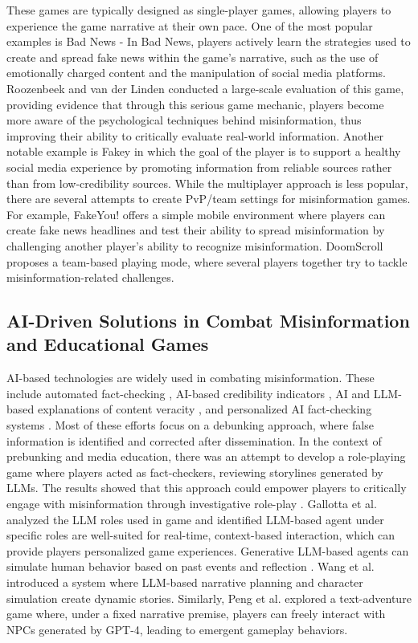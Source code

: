 These games are typically designed as single-player games, allowing players to experience the game narrative at their own pace. One of the most popular examples is Bad News \cite{roozenbeek2019fake}- In Bad News, players actively learn the strategies used to create and spread fake news within the game's narrative, such as the use of emotionally charged content and the manipulation of social media platforms. Roozenbeek and van der Linden \cite{roozenbeek2019fake} conducted a large-scale evaluation of this game, providing evidence that through this serious game mechanic, players become more aware of the psychological techniques behind misinformation, thus improving their ability to critically evaluate real-world information. Another notable example is Fakey \cite{micallef2021fakey} in which the goal of the player is to support a healthy social media experience by promoting information from reliable sources rather than from low-credibility sources. 
While the multiplayer approach is less popular, there are several attempts to create PvP/team settings for misinformation games. For example, FakeYou! \cite{clever2020fakeyou} offers a simple mobile environment where players can create fake news headlines and test their ability to spread misinformation by challenging another player's ability to recognize misinformation. DoomScroll \cite{wells2024sus} proposes a team-based playing mode, where several players together try to tackle misinformation-related challenges.

\subsection{AI-Driven Solutions in Combat Misinformation and Educational Games} 
AI-based technologies are widely used in combating misinformation. These include automated fact-checking \cite{choi2024fact}, AI-based credibility indicators \cite{lu2022effects}, AI and LLM-based explanations of content veracity \cite{horne2019rating,mitgenai2023}, and personalized AI fact-checking systems \cite{jahanbakhsh2023exploring}. Most of these efforts focus on a debunking approach, where false information is identified and corrected after dissemination. 
In the context of prebunking and media education, there was an attempt to develop a role-playing game where players acted as fact-checkers, reviewing storylines generated by LLMs. The results showed that this approach could empower players to critically engage with misinformation through investigative role-play \cite{tang2024mystery}. Gallotta et al. analyzed the LLM roles used in game and identified LLM-based agent under specific roles are well-suited for real-time, context-based interaction\cite{gallotta2024large}, which can provide players personalized game experiences. Generative LLM-based agents can simulate human behavior based on past events and reflection \cite{1park2023generative}. 
Wang et al. introduced a system where LLM-based narrative planning and character simulation create dynamic stories\cite{wang2024storyverse}. Similarly, Peng et al. explored a text-adventure game where, under a fixed narrative premise, players can freely interact with NPCs generated by GPT-4, leading to emergent gameplay behaviors\cite{peng2024player}. 

